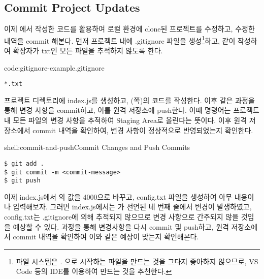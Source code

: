 \subsection*{Commit Project Updates}

이제 에서 작성한 코드를 활용하여 로컬 환경에 clone된 프로젝트를 수정하고, 수정한 내역을 commit 해본다. 먼저 프로젝트 내에 .gitignore 파일을 생성\footnote{파일 시스템은 . 으로 시작하는 파일을 만드는 것을 그다지 좋아하지 않으므로, VS Code 등의 IDE를 이용하여 만드는 것을 추천한다.}하고, \과 같이 작성하여 확장자가 txt인 모든 파일을 추적하지 않도록 한다.

\begin{codeenv}{code:gitignore-example}{.gitignore}\begin{verbatim}
*.txt
\end{verbatim}
\end{codeenv}

프로젝트 디렉토리에 index.js를 생성하고, (\pageref{code:nodejs-simple-web-server}쪽)의 코드를 작성한다. 이후 \와 같은 과정을 통해 변경 사항을 commit하고, 이를 원격 저장소에 push한다. 이때  명령어는 프로젝트 내 모든 파일의 변경 사항을 추적하여 Staging Area로 올린다는 뜻이다. 이후 원격 저장소에서 commit 내역을 확인하여, 변경 사항이 정상적으로 반영되었는지 확인한다.

\begin{shellenv}{shell:commit-and-push}{Commit Changes and Push Commits}\begin{verbatim}
$ git add .
$ git commit -m <commit-message>
$ git push
\end{verbatim}
\end{shellenv}

이제 index.js에서 의 값을 4000으로 바꾸고, config.txt 파일을 생성하여 아무 내용이나 입력해보자. 그러면 index.js에서는 가 선언된 네 번째 줄에서 변경이 발생하였고, config.txt는 .gitignore에 의해 추적되지 않으므로 변경 사항으로 간주되지 않을 것임을 예상할 수 있다.  과정을 통해 변경사항을 다시 commit 및 push하고, 원격 저장소에서 commit 내역을 확인하여 이와 같은 예상이 맞는지 확인해본다.
